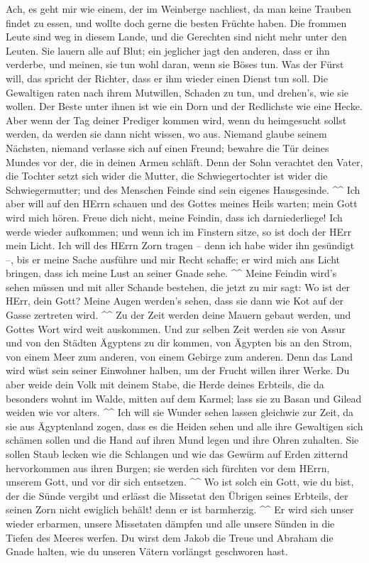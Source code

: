  Ach, es geht mir wie einem, der im Weinberge nachliest, da
man keine Trauben findet zu essen, und wollte doch gerne die besten
Früchte haben.  Die frommen Leute sind weg in diesem Lande,
und die Gerechten sind nicht mehr unter den Leuten. Sie lauern alle auf
Blut; ein jeglicher jagt den anderen, dass er ihn verderbe, 
und meinen, sie tun wohl daran, wenn sie Böses tun. Was der Fürst will,
das spricht der Richter, dass er ihm wieder einen Dienst tun soll. Die
Gewaltigen raten nach ihrem Mutwillen, Schaden zu tun, und drehen's, wie
sie wollen.  Der Beste unter ihnen ist wie ein Dorn und der
Redlichste wie eine Hecke. Aber wenn der Tag deiner Prediger kommen
wird, wenn du heimgesucht sollst werden, da werden sie dann nicht
wissen, wo aus.  Niemand glaube seinem Nächsten, niemand
verlasse sich auf einen Freund; bewahre die Tür deines Mundes vor der,
die in deinen Armen schläft.  Denn der Sohn verachtet den
Vater, die Tochter setzt sich wider die Mutter, die Schwiegertochter ist
wider die Schwiegermutter; und des Menschen Feinde sind sein eigenes
Hausgesinde. \^{}\^{}  Ich aber will auf den HErrn schauen
und des Gottes meines Heils warten; mein Gott wird mich hören.
 Freue dich nicht, meine Feindin, dass ich darniederliege!
Ich werde wieder aufkommen; und wenn ich im Finstern sitze, so ist doch
der HErr mein Licht.  Ich will des HErrn Zorn tragen -- denn
ich habe wider ihn gesündigt --, bis er meine Sache ausführe und mir
Recht schaffe; er wird mich ans Licht bringen, dass ich meine Lust an
seiner Gnade sehe. \^{}\^{}  Meine Feindin wird's sehen
müssen und mit aller Schande bestehen, die jetzt zu mir sagt: Wo ist der
HErr, dein Gott? Meine Augen werden's sehen, dass sie dann wie Kot auf
der Gasse zertreten wird. \^{}\^{}  Zu der Zeit werden
deine Mauern gebaut werden, und Gottes Wort wird weit auskommen.
 Und zur selben Zeit werden sie von Assur und von den
Städten Ägyptens zu dir kommen, von Ägypten bis an den Strom, von einem
Meer zum anderen, von einem Gebirge zum anderen.  Denn das
Land wird wüst sein seiner Einwohner halben, um der Frucht willen ihrer
Werke.  Du aber weide dein Volk mit deinem Stabe, die Herde
deines Erbteils, die da besonders wohnt im Walde, mitten auf dem Karmel;
lass sie zu Basan und Gilead weiden wie vor alters. \^{}\^{}
 Ich will sie Wunder sehen lassen gleichwie zur Zeit, da
sie aus Ägyptenland zogen,  dass es die Heiden sehen und
alle ihre Gewaltigen sich schämen sollen und die Hand auf ihren Mund
legen und ihre Ohren zuhalten.  Sie sollen Staub lecken wie
die Schlangen und wie das Gewürm auf Erden zitternd hervorkommen aus
ihren Burgen; sie werden sich fürchten vor dem HErrn, unserem Gott, und
vor dir sich entsetzen. \^{}\^{}  Wo ist solch ein Gott,
wie du bist, der die Sünde vergibt und erlässt die Missetat den Übrigen
seines Erbteils, der seinen Zorn nicht ewiglich behält! denn er ist
barmherzig. \^{}\^{}  Er wird sich unser wieder erbarmen,
unsere Missetaten dämpfen und alle unsere Sünden in die Tiefen des
Meeres werfen.  Du wirst dem Jakob die Treue und Abraham
die Gnade halten, wie du unseren Vätern vorlängst geschworen hast.
